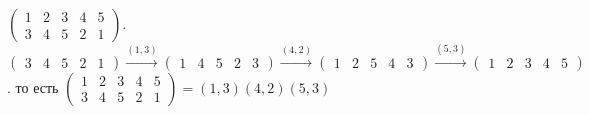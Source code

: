 \begin{example}
	\begin{example}
		\(\begin{pmatrix}
			1& 2  & 3 & 4 & 5 \\
			3 & 4 & 5 & 2 & 1
		\end{pmatrix}\). \(\begin{pmatrix}
		3 & 4 & 5 & 2 & 1
		\end{pmatrix}\overset{(1, 3)}{\longrightarrow}\begin{pmatrix}
		1 & 4 & 5 & 2 & 3
		\end{pmatrix}\overset{(4, 2)}{\longrightarrow}\begin{pmatrix}
		1 & 2 & 5 & 4 & 3
		\end{pmatrix}\overset{(5, 3)}{\longrightarrow}\begin{pmatrix}
		1 & 2 & 3 & 4 & 5
		\end{pmatrix}\). то есть \(\begin{pmatrix}
		1& 2  & 3 & 4 & 5 \\
		3 & 4 & 5 & 2 & 1
		\end{pmatrix} = (1, 3)(4, 2)(5, 3)\)
	\end{example}
\end{example}

